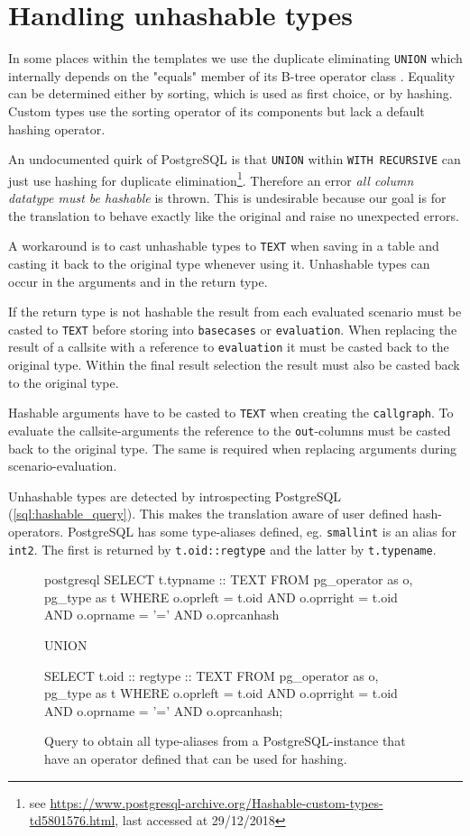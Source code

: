 \section{Handling unhashable types}

In some places within the templates we use the duplicate eliminating \texttt{UNION} which internally depends on the "equals" member of its B-tree operator class \cite[p. 1042 f.]{psql}. Equality can be determined either by sorting, which is used as first choice, or by hashing. Custom types use the sorting operator of its components but lack a default hashing operator.

An undocumented quirk of PostgreSQL is that \texttt{UNION} within \texttt{WITH RECURSIVE} can just use hashing for duplicate elimination\footnote{see \url{https://www.postgresql-archive.org/Hashable-custom-types-td5801576.html}, last accessed at 29/12/2018}. Therefore an error \textit{all column datatype must be hashable} is thrown. This is undesirable because our goal is for the translation to behave exactly like the original and raise no unexpected errors.

A workaround is to cast unhashable types to \texttt{TEXT} when saving in a table and casting it back to the original type whenever using it. Unhashable types can occur in the arguments and in the return type.

If the return type is not hashable the result from each evaluated scenario must be casted to \texttt{TEXT} before storing into \texttt{basecases} or \texttt{evaluation}. When replacing the result of a callsite with a reference to \texttt{evaluation} it must be casted back to the original type. Within the final result selection the result must also be casted back to the original type.

Hashable arguments have to be casted to \texttt{TEXT} when creating the \texttt{callgraph}. To evaluate the callsite-arguments the reference to the \texttt{out}-columns must be casted back to the original type. The same is required when replacing arguments during scenario-evaluation.

Unhashable types are detected by introspecting PostgreSQL (\autoref{sql:hashable_query}). This makes the translation aware of user defined hash-operators. PostgreSQL has some type-aliases defined, eg. \texttt{smallint} is an alias for \texttt{int2}. The first is returned by \texttt{t.oid::regtype} and the latter by \texttt{t.typename}.

\begin{figure}
    \centering
\begin{cminted}{postgresql}
SELECT t.typname :: TEXT 
FROM pg_operator as o, pg_type as t 
WHERE o.oprleft = t.oid 
  AND o.oprright = t.oid 
  AND o.oprname = '=' 
  AND o.oprcanhash 

UNION

SELECT t.oid :: regtype  :: TEXT 
FROM   pg_operator as o, pg_type as t 
WHERE o.oprleft = t.oid 
  AND o.oprright = t.oid 
  AND o.oprname = '=' 
  AND o.oprcanhash;
\end{cminted}
    \caption{Query to obtain all type-aliases from a PostgreSQL-instance that have an operator defined that can be used for hashing.}
    \label{sql:hashable_query}
\end{figure}